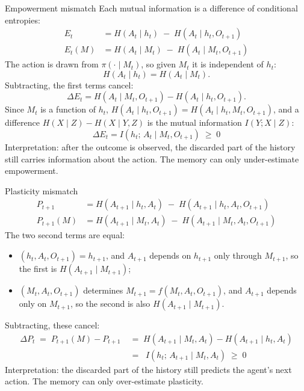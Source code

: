 \documentclass[11pt,aspectratio=169]{beamer}
\newcommand{\dE}{\Delta E}
\newcommand{\dP}{\Delta P}
\begin{document}
\begin{frame}{Empowerment mismatch}
Each mutual information is a difference of conditional entropies:
\begin{align*}
E_t &= H(A_t \mid h_t) \;-\; H(A_t \mid h_t, O_{t+1}) \\
E_t(M) &= H(A_t \mid M_t) \;-\; H(A_t \mid M_t, O_{t+1})
\end{align*}
The action is drawn from $\pi(\cdot \mid M_t)$, so given $M_t$ it is independent of $h_t$:
\[
H(A_t \mid h_t) = H(A_t \mid M_t).
\]
Subtracting, the first terms cancel:
\[
\dE_t = H(A_t \mid M_t, O_{t+1}) - H(A_t \mid h_t, O_{t+1}).
\]
Since $M_t$ is a function of $h_t$, $H(A_t \mid h_t, O_{t+1}) = H(A_t \mid h_t, M_t, O_{t+1})$, and a difference $H(X \mid Z) - H(X \mid Y, Z)$ is the mutual information $I(Y; X \mid Z)$:
\[
\boxed{\;\dE_t = I(h_t;\, A_t \mid M_t, O_{t+1}) \;\ge\; 0\;}
\]
Interpretation: after the outcome is observed, the discarded part of the history still carries information about the action. The memory can only under-estimate empowerment.
\end{frame}

\begin{frame}{Plasticity mismatch}
\begin{align*}
P_{t+1} &= H(A_{t+1} \mid h_t, A_t) \;-\; H(A_{t+1} \mid h_t, A_t, O_{t+1}) \\
P_{t+1}(M) &= H(A_{t+1} \mid M_t, A_t) \;-\; H(A_{t+1} \mid M_t, A_t, O_{t+1})
\end{align*}
The two second terms are equal:
\begin{itemize}
\item $(h_t, A_t, O_{t+1}) = h_{t+1}$, and $A_{t+1}$ depends on $h_{t+1}$ only through $M_{t+1}$, so the first is $H(A_{t+1} \mid M_{t+1})$;
\item $(M_t, A_t, O_{t+1})$ determines $M_{t+1} = f(M_t, A_t, O_{t+1})$, and $A_{t+1}$ depends only on $M_{t+1}$, so the second is also $H(A_{t+1} \mid M_{t+1})$.
\end{itemize}
Subtracting, these cancel:
\begin{align*}
\dP_t \;=\; P_{t+1}(M) - P_{t+1} &\;=\; H(A_{t+1} \mid M_t, A_t) - H(A_{t+1} \mid h_t, A_t) \\
&\;=\; \boxed{\; I(h_t;\, A_{t+1} \mid M_t, A_t) \;\ge\; 0 \;}
\end{align*}
Interpretation: the discarded part of the history still predicts the agent's next action. The memory can only over-estimate plasticity.
\end{frame}
\end{document}
